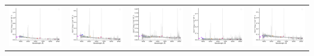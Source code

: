 \begin{center}
\begin{longtable}{l l l l l }
    \includegraphics[width=0.19\linewidth, clip]{Figs/Figs-sdss/spec-1024-52826-0028-STRIPE82-0109-049060.pdf} & \includegraphics[width=0.19\linewidth, clip]{Figs/Figs-sdss/spec-1033-52822-0623-STRIPE82-0134-016856.pdf} & \includegraphics[width=0.19\linewidth, clip]{Figs/Figs-sdss/spec-1035-52816-0289-SPLUS-s02s08-035461.pdf} & \includegraphics[width=0.19\linewidth, clip]{Figs/Figs-sdss/spec-1068-52614-0292-STRIPE82-0061-011616.pdf} & \includegraphics[width=0.19\linewidth, clip]{Figs/Figs-sdss/spec-1068-52614-0500-STRIPE82-0064-029944.pdf} \\

\end{longtable}
\end{center}
